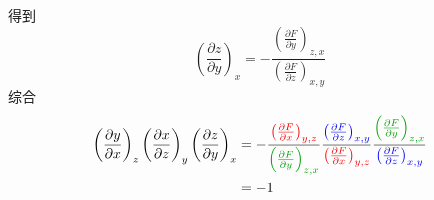 得到
\begin{equation}
    \left( \frac{\partial z}{\partial y} \right) _x=-\frac{\left( \frac{\partial F}{\partial y} \right) _{z,x}}{\left( \frac{\partial F}{\partial z} \right) _{x,y}}
\end{equation}
综合
\begin{equation}
    \begin{aligned}
        \left( \frac{\partial y}{\partial x} \right) _z\left( \frac{\partial x}{\partial z} \right) _y\left( \frac{\partial z}{\partial y} \right) _x&=-\frac{{\color[RGB]{240, 0, 0} \left( \frac{\partial F}{\partial x} \right) _{y,z}}}{{\color[RGB]{0, 160, 0} \left( \frac{\partial F}{\partial y} \right) _{z,x}}}\frac{{\color[RGB]{0, 0, 240} \left( \frac{\partial F}{\partial z} \right) _{x,y}}}{{\color[RGB]{240, 0, 0} \left( \frac{\partial F}{\partial x} \right) _{y,z}}}\frac{{\color[RGB]{0, 160, 0} \left( \frac{\partial F}{\partial y} \right) _{z,x}}}{{\color[RGB]{0, 0, 240} \left( \frac{\partial F}{\partial z} \right) _{x,y}}}
\\
&=-1
    \end{aligned}
\end{equation}




